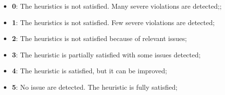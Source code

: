 \begin{itemize}
\item \textbf{0}: The heuristics is not satisfied. Many severe violations are detected;;
\item \textbf{1}: The heuristics is not satisfied. Few severe violations are detected;
\item \textbf{2}: The heuristics is not satisfied because of relevant issues;
\item \textbf{3}: The heuristic is partially satisfied with some issues detected;
\item \textbf{4}: The heuristic is satisfied, but it can be improved;
\item \textbf{5}: No issue are detected. The heuristic is fully satisfied; 
\end{itemize}